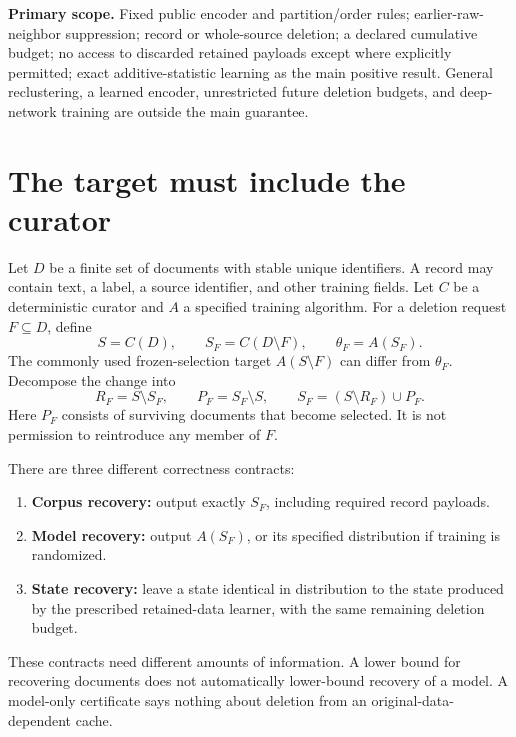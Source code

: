 \documentclass[11pt,a4paper]{article}
\theoremstyle{definition}\newtheorem{definition}[theorem]{Definition}
\newcommand{\minus}{\setminus}
\begin{document}
\textbf{Primary scope.} Fixed public encoder and partition/order rules; earlier-raw-neighbor suppression; record or whole-source deletion; a declared cumulative budget; no access to discarded retained payloads except where explicitly permitted; exact additive-statistic learning as the main positive result. General reclustering, a learned encoder, unrestricted future deletion budgets, and deep-network training are outside the main guarantee.

\newpage
\begingroup
\small\setlength{\parskip}{0pt}
\tableofcontents
\endgroup
\newpage

\section{The target must include the curator}
Let $D$ be a finite set of documents with stable unique identifiers. A record may contain text, a label, a source identifier, and other training fields. Let $C$ be a deterministic curator and $A$ a specified training algorithm. For a deletion request $F\subseteq D$, define
\begin{equation}
 S=C(D),\qquad S_F=C(D\minus F),\qquad \theta_F=A(S_F).
\end{equation}
The commonly used frozen-selection target $A(S\minus F)$ can differ from $\theta_F$. Decompose the change into
\begin{equation}
 R_F=S\minus S_F,\qquad P_F=S_F\minus S,\qquad
 S_F=(S\minus R_F)\cup P_F.
\end{equation}
Here $P_F$ consists of surviving documents that become selected. It is not permission to reintroduce any member of $F$.

There are three different correctness contracts:
\begin{enumerate}
\item \textbf{Corpus recovery:} output exactly $S_F$, including required record payloads.
\item \textbf{Model recovery:} output $A(S_F)$, or its specified distribution if training is randomized.
\item \textbf{State recovery:} leave a state identical in distribution to the state produced by the prescribed retained-data learner, with the same remaining deletion budget.
\end{enumerate}
These contracts need different amounts of information. A lower bound for recovering documents does not automatically lower-bound recovery of a model. A model-only certificate says nothing about deletion from an original-data-dependent cache.
\end{document}
